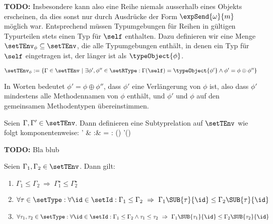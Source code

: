 {\bf TODO:} Insbesondere kann also eine Reihe niemals ausserhalb eines Objekts erscheinen, da dies sonst nur durch
Ausdr\"ucke der Form $\expSend{\omega}{m}$ m\"oglich war. Entsprechend m\"ussen Typumgebungen f\"ur
Reihen in g\"ultigen Typurteilen stets einen Typ f\"ur $\self$ enthalten. Dazu definieren wir
eine Menge $\setTEnv_\phi \subseteq \setTEnv$, die alle Typumgebungen enth\"alt, in denen ein Typ
f\"ur $\self$ eingetragen ist, der l\"anger ist als $\typeObject{\phi}$.

\begin{definition} \label{definition:Lom:Typumgebungen_fuer_Reihen}
  $\setTEnv_\phi := \{\Gamma \in\setTEnv\ \vert\ \exists \phi',\phi''\in\setRType: \Gamma(\self)=\typeObject{\phi'}
                                                 \wedge \phi' = \phi \oplus \phi''\}$
\end{definition}
%
In Worten bedeutet $\phi' = \phi \oplus \phi''$, dass $\phi'$ eine Verl\"angerung von $\phi$ ist,
also dass $\phi'$ mindestens alle Methodennamen von $\phi$ enth\"alt, und $\phi'$ und $\phi$ auf
den gemeinsamen Methodentypen \"ubereinstimmen.

\begin{definition} \label{definition:Lom:Typumgebungen_und_Subtyping}
  Seien $\Gamma,\Gamma'\in\setTEnv$. Dann definieren eine Subtyprelation auf $\setTEnv$ wie folgt
  komponentenweise:
  \EQNbeg
    \Gamma' \le \Gamma
    & :\Leftrightarrow &
    \dom{\Gamma} =  \wedge \forall \id\in\dom{\Gamma}: \Gamma(\id) \le \Gamma'(\id)
  \EQNend
\end{definition}

{\bf TODO:} Bla blub

\begin{lemma} \label{lemma:Lom:Typumgebungen_und_Subtyping} 
  Seien $\Gamma_1,\Gamma_2\in\setTEnv$. Dann gilt:
  \begin{enumerate}
    \item $\Gamma_1 \le \Gamma_2 \ \Rightarrow \ \Gamma_1^\star \le \Gamma_2^\star$
    \item $\forall \tau\in\setType: \forall \id\in\setId:
           \Gamma_1 \le \Gamma_2 \ \Rightarrow \ \Gamma_1\SUB{\tau}{\id} \le \Gamma_2\SUB{\tau}{\id}$
    \item $\forall \tau_1,\tau_2\in\setType: \forall\id\in\setId:
           \Gamma_1 \le \Gamma_2 \wedge \tau_1 \le \tau_2 \ \Rightarrow \ \Gamma_1\SUB{\tau_1}{\id} \le \Gamma_2\SUB{\tau_2}{\id}$
  \end{enumerate}
\end{lemma}

